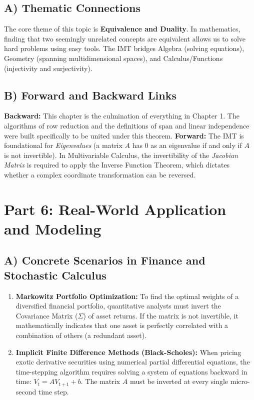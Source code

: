 \documentclass[11pt]{article}
\begin{document}
\subsection*{A) Thematic Connections}
The core theme of this topic is \textbf{Equivalence and Duality}. In mathematics, finding that two seemingly unrelated concepts are equivalent allows us to solve hard problems using easy tools. The IMT bridges Algebra (solving equations), Geometry (spanning multidimensional spaces), and Calculus/Functions (injectivity and surjectivity). 

\subsection*{B) Forward and Backward Links}
\textbf{Backward:} This chapter is the culmination of everything in Chapter 1. The algorithms of row reduction and the definitions of span and linear independence were built specifically to be united under this theorem.
\textbf{Forward:} The IMT is foundational for \textit{Eigenvalues} (a matrix $A$ has 0 as an eigenvalue if and only if $A$ is not invertible). In Multivariable Calculus, the invertibility of the \textit{Jacobian Matrix} is required to apply the Inverse Function Theorem, which dictates whether a complex coordinate transformation can be reversed.

\section*{Part 6: Real-World Application and Modeling}

\subsection*{A) Concrete Scenarios in Finance and Stochastic Calculus}
\begin{enumerate}
    \item \textbf{Markowitz Portfolio Optimization:} To find the optimal weights of a diversified financial portfolio, quantitative analysts must invert the Covariance Matrix ($\Sigma$) of asset returns. If the matrix is not invertible, it mathematically indicates that one asset is perfectly correlated with a combination of others (a redundant asset).
    \item \textbf{Implicit Finite Difference Methods (Black-Scholes):} When pricing exotic derivative securities using numerical partial differential equations, the time-stepping algorithm requires solving a system of equations backward in time: $V_{t} = A V_{t+1} + b$. The matrix $A$ must be inverted at every single micro-second time step.
\end{enumerate}
\end{document}
